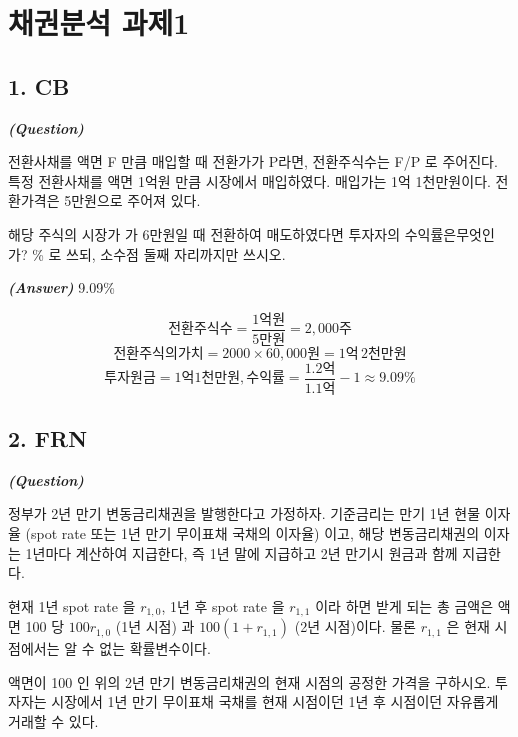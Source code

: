 \documentclass[
  letterpaper,
  DIV=11,
  numbers=noendperiod]{scrreprt}
\begin{document}
\chapter*{채권분석 과제1}\label{uxcc44uxad8cuxbd84uxc11d-uxacfcuxc81c1}


\section*{1. CB}\label{cb}


\textbf{\emph{(Question)}}

전환사채를 액면 F 만큼 매입할 때 전환가가 P라면, 전환주식수는 F/P 로
주어진다. 특정 전환사채를 액면 1억원 만큼 시장에서 매입하였다. 매입가는
1억 1천만원이다. 전환가격은 5만원으로 주어져 있다.

해당 주식의 시장가 가 6만원일 때 전환하여 매도하였다면 투자자의
수익률은무엇인가? \% 로 쓰되, 소수점 둘째 자리까지만 쓰시오.

\textbf{\emph{(Answer)}} 9.09\%

\[전환주식수 = \frac{1억원}{5만원} = 2,000주\]
\[전환주식의 가치 = 2000\times 60,000원=1억\,2천만원\]
\[투자원금=1억1천만원, 수익률=\frac{1.2억}{1.1억}-1\approx 9.09\%\]

\section*{2. FRN}\label{frn}


\textbf{\emph{(Question)}}

정부가 2년 만기 변동금리채권을 발행한다고 가정하자. 기준금리는 만기 1년
현물 이자율 (spot rate 또는 1년 만기 무이표채 국채의 이자율) 이고, 해당
변동금리채권의 이자는 1년마다 계산하여 지급한다, 즉 1년 말에 지급하고
2년 만기시 원금과 함께 지급한다.

현재 1년 spot rate 을 \(r_{1,0}\), 1년 후 spot rate 을 \(r_{1,1}\) 이라
하면 받게 되는 총 금액은 액면 100 당 \(100r_{1,0}\) (1년 시점) 과
\(100(1 + r_{1,1})\) (2년 시점)이다. 물론 \(r_{1,1}\) 은 현재 시점에서는
알 수 없는 확률변수이다.

액면이 100 인 위의 2년 만기 변동금리채권의 현재 시점의 공정한 가격을
구하시오. 투자자는 시장에서 1년 만기 무이표채 국채를 현재 시점이던 1년
후 시점이던 자유롭게 거래할 수 있다.
\end{document}
